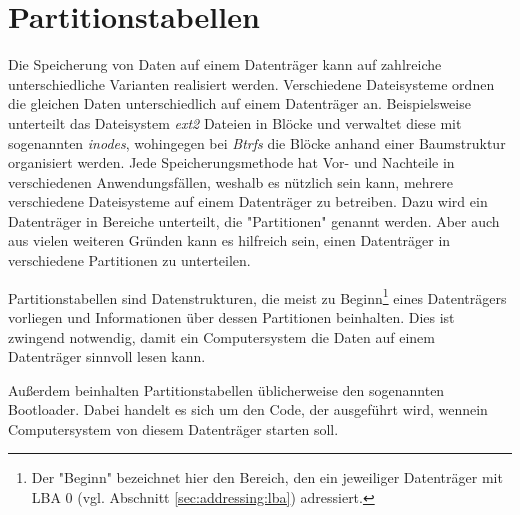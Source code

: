 \section{Partitionstabellen}
Die Speicherung von Daten auf einem Datenträger kann auf zahlreiche unterschiedliche Varianten realisiert werden.
Verschiedene Dateisysteme ordnen die gleichen Daten unterschiedlich auf einem Datenträger an.
Beispielsweise unterteilt das Dateisystem \textit{ext2} Dateien in Blöcke und verwaltet diese mit sogenannten \textit{inodes}, wohingegen bei \textit{Btrfs} die Blöcke anhand einer Baumstruktur organisiert werden. 
Jede Speicherungsmethode hat Vor- und Nachteile in verschiedenen Anwendungsfällen, weshalb es nützlich sein kann, mehrere verschiedene Dateisysteme auf einem Datenträger zu betreiben.
Dazu wird ein Datenträger in Bereiche unterteilt, die "Partitionen" genannt werden.
Aber auch aus vielen weiteren Gründen kann es hilfreich sein, einen Datenträger in verschiedene Partitionen zu unterteilen.

Partitionstabellen sind Datenstrukturen, die meist zu Beginn\footnote{
    Der "Beginn" bezeichnet hier den Bereich, den ein jeweiliger Datenträger mit LBA 0 (vgl. Abschnitt \ref{sec:addressing:lba}) adressiert.
}
eines Datenträgers vorliegen und Informationen über dessen Partitionen beinhalten.
Dies ist zwingend notwendig, damit ein Computersystem die Daten auf einem Datenträger sinnvoll lesen kann.

Außerdem beinhalten Partitionstabellen üblicherweise den sogenannten Bootloader. Dabei handelt es sich um den Code, der ausgeführt wird, wennein Computersystem von diesem Datenträger starten soll.